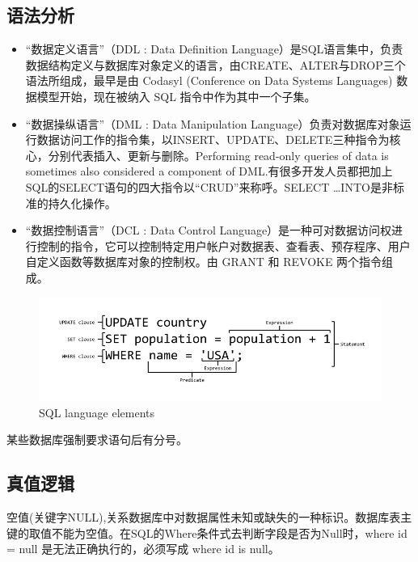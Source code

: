 \subsection{语法分析}
\begin{itemize}
    \item 
“数据定义语言”（DDL : Data Definition Language）是SQL语言集中，负责数据结构定义与数据库对象定义的语言，由CREATE、ALTER与DROP三个语法所组成，最早是由 Codasyl (Conference on Data Systems Languages) 数据模型开始，现在被纳入 SQL 指令中作为其中一个子集。
    \item 
“数据操纵语言”（DML : Data Manipulation Language）负责对数据库对象运行数据访问工作的指令集，以INSERT、UPDATE、DELETE三种指令为核心，分别代表插入、更新与删除。Performing read-only queries of data is sometimes also considered a component of DML.有很多开发人员都把加上SQL的SELECT语句的四大指令以“CRUD”来称呼。SELECT \ldots INTO是非标准的持久化操作。
    \item 
“数据控制语言”（DCL : Data Control Language）是一种可对数据访问权进行控制的指令，它可以控制特定用户帐户对数据表、查看表、预存程序、用户自定义函数等数据库对象的控制权。由 GRANT 和 REVOKE 两个指令组成。
\end{itemize}

\begin{figure}[htpb]
    \begin{center}
        \includegraphics[keepaspectratio,width=0.5\paperwidth]{Pictures/SQL_ANATOMY_wiki.svg.png}
    \end{center}
    \caption{SQL language elements}
    \label{fig:SQL lan elem}
\end{figure}

某些数据库强制要求语句后有分号。

\subsection{真值逻辑}

空值(关键字NULL),关系数据库中对数据属性未知或缺失的一种标识。数据库表主键的取值不能为空值。在SQL的Where条件式去判断字段是否为Null时，where id = null 是无法正确执行的，必须写成 where id is null。

